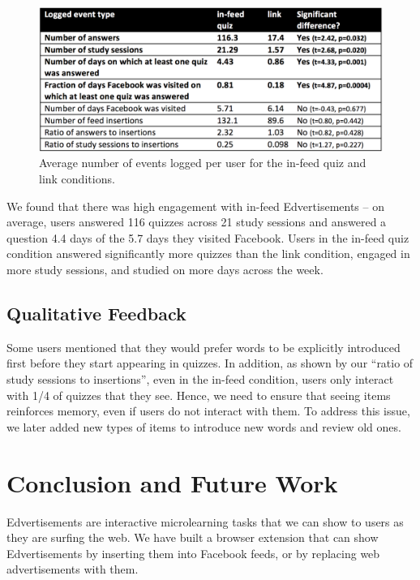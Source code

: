 \documentclass{sigchi}
\begin{document}
\begin{figure}
\centering
\includegraphics[width=1.0\columnwidth]{event-logs-feedlearn}
\caption{Average number of events logged per user for the in-feed quiz and link conditions.}
\label{fig:event-logs}
\end{figure}

We found that there was high engagement with in-feed Edvertisements -- on average, users answered 116 quizzes across 21 study sessions and answered a question 4.4 days of the 5.7 days they visited Facebook. Users in the in-feed quiz condition answered significantly more quizzes than the link condition, engaged in more study sessions, and studied on more days across the week. %

\subsection{Qualitative Feedback}

Some users mentioned that they would prefer words to be explicitly introduced first before they start appearing in quizzes.  In addition, as shown by our ``ratio of study sessions to insertions'', even in the in-feed condition, users only interact with 1/4 of quizzes that they see. Hence, we need to ensure that seeing items reinforces memory, even if users do not interact with them. To address this issue, we later added new types of items to introduce new words and review old ones.

\section{Conclusion and Future Work}

Edvertisements are interactive microlearning tasks that we can show to users as they are surfing the web. We have built a browser extension that can show Edvertisements by inserting them into Facebook feeds, or by replacing web advertisements with them.
\end{document}
